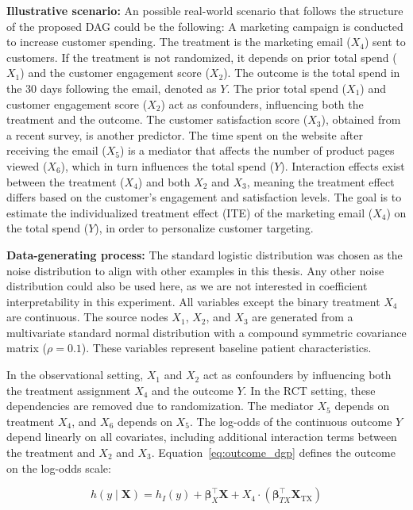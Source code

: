 \medskip

\textbf{Illustrative scenario:} An possible real-world scenario that follows the structure of the proposed DAG could be the following: A marketing campaign is conducted to increase customer spending. The treatment is the marketing email ($X_4$) sent to customers. If the treatment is not randomized, it depends on prior total spend ($X_1$) and the customer engagement score ($X_2$). The outcome is the total spend in the 30 days following the email, denoted as $Y$. The prior total spend ($X_1$) and customer engagement score ($X_2$) act as confounders, influencing both the treatment and the outcome. The customer satisfaction score ($X_3$), obtained from a recent survey, is another predictor. The time spent on the website after receiving the email ($X_5$) is a mediator that affects the number of product pages viewed ($X_6$), which in turn influences the total spend ($Y$). Interaction effects exist between the treatment ($X_4$) and both $X_2$ and $X_3$, meaning the treatment effect differs based on the customer's engagement and satisfaction levels. The goal is to estimate the individualized treatment effect (ITE) of the marketing email ($X_4$) on the total spend ($Y$), in order to personalize customer targeting.

\medskip

\textbf{Data-generating process:} The standard logistic distribution was chosen as the noise distribution to align with other examples in this thesis. Any other noise distribution could also be used here, as we are not interested in coefficient interpretability in this experiment. All variables except the binary treatment $X_4$ are continuous. The source nodes $X_1$, $X_2$, and $X_3$ are generated from a multivariate standard normal distribution with a compound symmetric covariance matrix ($\rho = 0.1$). These variables represent baseline patient characteristics.

In the observational setting, $X_1$ and $X_2$ act as confounders by influencing both the treatment assignment $X_4$ and the outcome $Y$. In the RCT setting, these dependencies are removed due to randomization. The mediator $X_5$ depends on treatment $X_4$, and $X_6$ depends on $X_5$. The log-odds of the continuous outcome $Y$ depend linearly on all covariates, including additional interaction terms between the treatment and $X_2$ and $X_3$. Equation~\ref{eq:outcome_dgp} defines the outcome on the log-odds scale:

\begin{equation}
h(y \mid \mathbf{X}) = h_I(y) + \boldsymbol{\beta}_X^\top \mathbf{X} + X_4 \cdot (\boldsymbol{\beta}_{TX}^\top \mathbf{X}_{\text{TX}})
\label{eq:outcome_dgp}
\end{equation}


